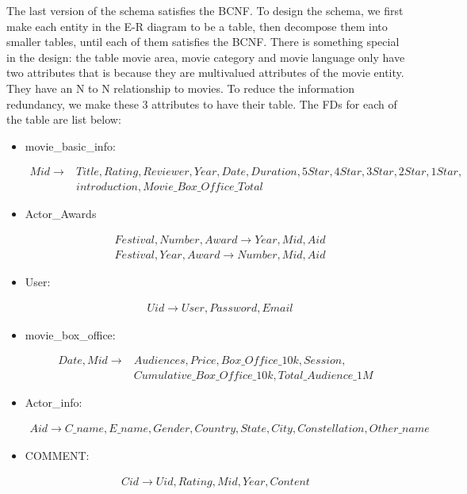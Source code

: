 \documentclass[a4paper]{article}
\begin{document}
The last version of the schema satisfies the BCNF\@. To design the schema, we first make each entity in the E-R diagram to be a table, then decompose them into smaller tables, until each of them satisfies the BCNF\@. There is something special in the design: the table movie area, movie category and movie language only have two attributes that is because they are multivalued attributes of the movie entity. They have an N to N relationship to movies. To reduce the information redundancy, we make these 3 attributes to have their table. The FDs for each of the table are list below:
\begin{itemize}
  \item movie\_basic\_info:
    \begin{fleqn}
      \begin{align*}
      Mid \rightarrow &Title, Rating, Reviewer, Year, Date, Duration, 5Star, 4Star, 3Star, 2Star, 1Star, \\
      &introduction, Movie\_Box\_Office\_Total
      \end{align*}
    \end{fleqn}

  \item Actor\_Awards
        \begin{fleqn}
          \begin{align*}
      &Festival, Number, Award \rightarrow Year, Mid, Aid \\
      &Festival, Year, Award \rightarrow Number, Mid, Aid
          \end{align*}
        \end{fleqn}
  \item User:
        \begin{fleqn}
          \begin{align*}
     &Uid \rightarrow User, Password, Email
          \end{align*}
        \end{fleqn}
  \item movie\_box\_office:
        \begin{fleqn}
          \begin{align*}
       Date, Mid \rightarrow &Audiences, Price, Box\_Office\_10k, Session, \\ &Cumulative\_Box\_Office\_10k, Total\_Audience\_1M
          \end{align*}
        \end{fleqn}
  \item Actor\_info:
    \begin{fleqn}
      \begin{align*}
      Aid \rightarrow C\_name, E\_name, Gender, Country, State, City, Constellation, Other\_name
      \end{align*}
    \end{fleqn}
  \item COMMENT:
    \begin{fleqn}
      \begin{align*}
       Cid \rightarrow Uid, Rating, Mid, Year, Content
      \end{align*}
    \end{fleqn}
\end{itemize}
\end{document}
